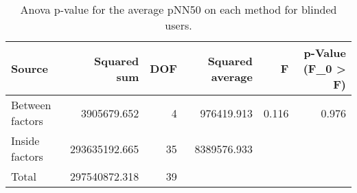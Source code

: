 
\begin{table}[!htb]
\centering
\caption{Anova p-value for the average pNN50 on each method for blinded users.}
\label{tab:anova_average_pnn50}
\begin{tabular}{lrrrrr}
\toprule
         Source &   Squared sum &  DOF & Squared average &     F & p-Value (F\_0 > F) \\
\midrule
Between factors &   3905679.652 &    4 &      976419.913 & 0.116 &             0.976 \\
 Inside factors & 293635192.665 &   35 &     8389576.933 &       &                   \\
          Total & 297540872.318 &   39 &                 &       &                   \\
\bottomrule
\end{tabular}
\end{table}

